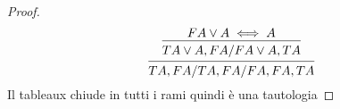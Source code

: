 \begin{proof}
\begin{equation*}
\begin{prooftree}
\hypo{F A \lor A \iff A}
\infer1 {T A \lor A,FA / F A \lor A,TA}
\infer1 {TA,FA/TA,FA/FA,FA,TA}
\end{prooftree}
\end{equation*}
Il tableaux chiude in tutti i rami quindi è una tautologia
\end{proof}
